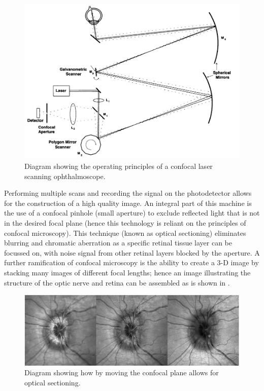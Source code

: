 \begin{figure}[H]
\centering
\includegraphics{figures/cslo}
\caption{Diagram showing the operating principles of a confocal \gls{laser} scanning ophthalmoscope.\cite{5_bennett_2015}}
\label{fig:cslo}
\end{figure}

Performing multiple scans and recording the signal on the photodetector
allows for the construction of a high quality image. An integral part of
this machine is the use of a confocal pinhole (small aperture) to exclude
reflected light that is not in the desired focal plane (hence this technology
is reliant on the principles of confocal microscopy). This technique (known as
optical sectioning) eliminates blurring and chromatic aberration as a specific
retinal tissue layer can be focussed on, with noise signal from other retinal
layers blocked by the aperture.\cite{sharp2004scanning} A further
ramification of confocal microscopy is the ability to create a 3-D image by
stacking many images of different focal lengths; hence an image illustrating
the structure of the optic nerve and retina can be assembled as is shown in .

\begin{figure}[H]
\centering
\includegraphics{figures/confocalimages}
\caption{Diagram showing how by moving the confocal plane allows for optical sectioning.\cite{sharp2004scanning}}
\label{fig:3dconfocal}
\end{figure}

